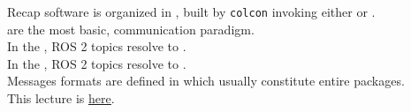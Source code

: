 
\begin{frame}{Recap}
  \justifying
	 software is organized in , built by \texttt{colcon} invoking either  or .\\
	\bigskip
	 are the most basic,  communication paradigm.\\
	In the , ROS 2 topics resolve to .\\
  In the , ROS 2 topics resolve to .\\
	\bigskip
	Messages formats are defined in  which usually constitute entire packages.\\
	\bigskip
	This lecture is \href{https://github.com/robmasocco/DAFN26_Robotics_6}{\color{blue}\underline{here}}.
\end{frame}
